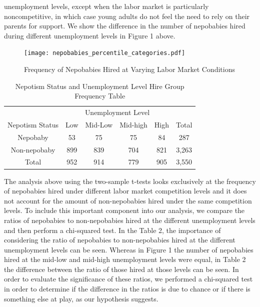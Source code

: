 \documentclass[12pt]{article}
\begin{document}
unemployment levels, except when the labor market is particularly noncompetitive, in which case young adults do not feel the need to rely on their parents for support. We show the difference in the number of nepobabies hired during different unemployment levels in Figure 1 above. 

\begin{figure}
    \centering
    \texttt{[image: nepobabies\_percentile\_categories.pdf]}
    \caption{Frequency of Nepobabies Hired at Varying Labor Market Conditions}
    \label{fig:enter-label}
\end{figure}


\begin{table}[ht]
\centering
\begin{tabular}{c|cccc|c}
  & \multicolumn{4}{c}{Unemployment Level} &   \\
Nepotism Status & Low & Mid-Low & Mid-high & High   & Total \\
\hline
Nepobaby & 53 & 75 & 75 & 84 & 287 \\
Non-nepobaby & 899 & 839 & 704 & 821 & 3,263 \\
\hline
Total & 952 & 914 & 779 & 905 & 3,550 \\
\end{tabular}
\caption{Nepotism Status and Unemployment Level Hire Group Frequency Table}
\label{tab:mytable}
\end{table}


The analysis above using the two-sample t-tests looks exclusively at the frequency of nepobabies hired under different labor market competition levels and it does not account for the amount of non-nepobabies hired under the same competition levels. To include this important component into our analysis, we compare the ratios of nepobabies to non-nepobabies hired at the different unemployment levels and then perform a chi-squared test. In the Table 2, the importance of considering the ratio of nepobabies to non-nepobabies hired at the different unemployment levels can be seen. Whereas in Figure 1 the number of nepobabies hired at the mid-low and mid-high unemployment levels were equal, in Table 2 the difference between the ratio of those hired at those levels can be seen. In order to evaluate the significance of these ratios, we performed a chi-squared test in order to determine if the difference in the ratios is due to chance or if there is something else at play, as our hypothesis suggests.
\end{document}
